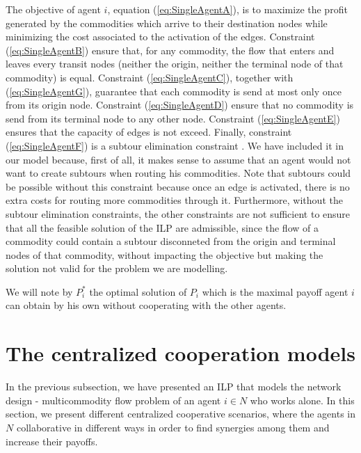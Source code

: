 \documentclass[review]{elsarticle}
\begin{document}
The objective of agent $i$, equation (\ref{eq:SingleAgentA}), is to maximize the
profit generated by the commodities which arrive to their destination nodes
while minimizing the cost associated to the activation of the edges. Constraint
(\ref{eq:SingleAgentB}) ensure that, for any commodity, the flow that enters
and leaves every transit nodes (neither the origin, neither the terminal node of
that commodity) is equal. Constraint (\ref{eq:SingleAgentC}), together with
(\ref{eq:SingleAgentG}), guarantee that each commodity is send at most only once
from its origin node. Constraint (\ref{eq:SingleAgentD}) ensure that no
commodity is send from its terminal node to any other node. Constraint (\ref{eq:SingleAgentE})
ensures that the capacity of edges is not exceed. Finally, constraint
(\ref{eq:SingleAgentF}) is a subtour elimination constraint \cite{AHUJA1993}. We have included it in our model because, first of all, it makes sense to assume that an agent would not want to create subtours when routing his commodities. Note that subtours could be possible without this constraint because once an edge is activated, there is no extra costs for routing more commodities through it. Furthermore, without the subtour elimination constraints, the other constraints are not sufficient to ensure that all the feasible solution of the ILP are admissible, since the flow of a commodity could contain a subtour disconneted from the origin and terminal nodes of that commodity, without impacting the objective but making the solution not valid for the problem we are modelling.

We will note by $P_i^*$ the optimal solution of $P_i$ which is the maximal
payoff agent $i$ can obtain by his own without cooperating with the other agents.

\section{The centralized cooperation models} \label{seq:centrmodels}

In the previous subsection, we have presented an ILP that models the network design - multicommodity flow problem of an agent $i\in N$ who works alone. In this section, we present different centralized cooperative scenarios, where the agents in $N$ collaborative in different ways in order to find synergies among them and increase their payoffs.
\end{document}

